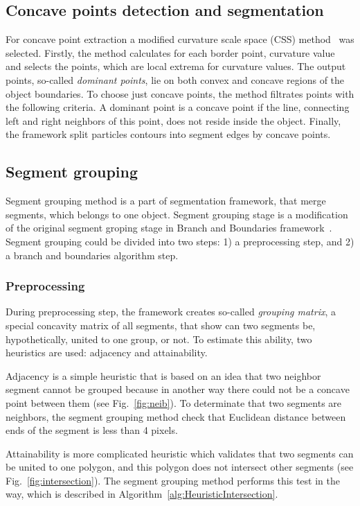 \documentclass{lutmscthesis}[2010/09/22]
\begin{document}
\subsection{Concave points detection and segmentation}

For concave point extraction a modified curvature scale space (CSS) method~\cite{CSS} was selected. 
Firstly, the method calculates for each border point, curvature value~\cite{CSS} and selects the points, which are local extrema for curvature values.  
The output points, so-called \textit{dominant points}, lie on both convex and concave regions of the object boundaries. To choose just concave points, the method filtrates points with the following criteria. A dominant point is a concave point if the line, connecting left and right neighbors of this point, does not reside inside the object. 
Finally, the framework split particles contours into segment edges by concave points.

\subsection{Segment grouping}

Segment grouping method is a part of segmentation framework, that merge segments, which belongs to one object. Segment grouping stage is a modification of the original segment groping stage in Branch and Boundaries framework~\cite{zafari-bb}.  Segment grouping could be divided into two steps: 1) a preprocessing step, and 2) a branch and boundaries algorithm step.

\subsubsection{Preprocessing} 
During preprocessing step, the framework creates so-called \textit{grouping matrix}, a special concavity matrix of all segments, that show can two segments be, hypothetically, united to one group, or not. To estimate this ability, two heuristics are used: adjacency and attainability.

Adjacency is a simple heuristic that is based on an idea that two neighbor segment cannot be grouped because in another way there could not be a concave point between them  (see Fig.~\ref{fig:neib}). To determinate that two segments are neighbors, the segment grouping method check that Euclidean distance between ends of the segment is less than 4 pixels.

Attainability is more complicated heuristic which validates that two segments can be united to one polygon, and this polygon does not intersect other segments (see Fig.~\ref{fig:intersection}). The segment grouping method performs this test in the way, which is described in Algorithm~\ref{alg:HeuristicIntersection}.
\end{document}
